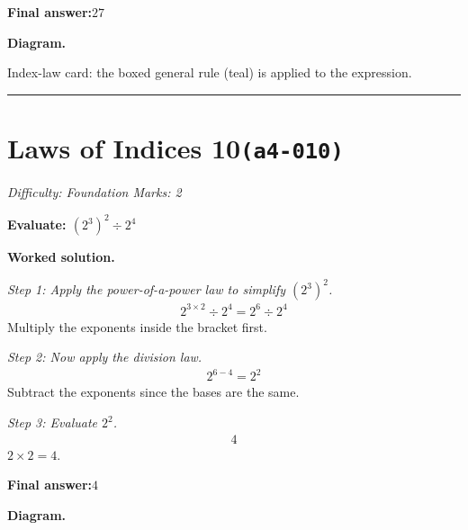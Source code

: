 \documentclass[11pt]{article}
\newcommand{\question}[1]{\par\medskip\noindent\textbf{#1}\par}
\begin{document}
\begin{answerbox}
\textbf{Final answer:}\quad \(\displaystyle 27\)
\end{answerbox}
\textbf{Diagram.}

\begin{center}
\end{center}
\small Index-law card: the boxed general rule (teal) is applied to the expression.\normalsize

\medskip\hrule

\section*{Laws of Indices 10\quad\small\texttt{(a4-010)}}
\textit{Difficulty: Foundation \quad\textbar\quad Marks: 2}

\question{Evaluate: \( (2^3)^2 \div 2^4 \)}

\textbf{Worked solution.}

\textit{Step 1: Apply the power-of-a-power law to simplify \( (2^3)^2 \).}
\[\begin{gathered}
2^{3 \times 2} \div 2^4 = 2^6 \div 2^4
\end{gathered}\]
Multiply the exponents inside the bracket first.

\textit{Step 2: Now apply the division law.}
\[\begin{gathered}
2^{6-4} = 2^2
\end{gathered}\]
Subtract the exponents since the bases are the same.

\textit{Step 3: Evaluate \( 2^2 \).}
\[\begin{gathered}
4
\end{gathered}\]
\( 2 \times 2 = 4 \).

\begin{answerbox}
\textbf{Final answer:}\quad \(\displaystyle 4\)
\end{answerbox}
\textbf{Diagram.}
\end{document}
